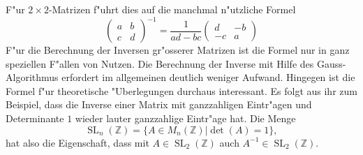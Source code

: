 F"ur $2\times2$-Matrizen f"uhrt dies auf die manchmal n"utzliche
Formel
\[
\begin{pmatrix}
a&b\\c&d
\end{pmatrix}^{-1}
=
\frac1{ad-bc}\begin{pmatrix}
d&-b\\-c&a
\end{pmatrix}
\]
F"ur die Berechnung der Inversen gr"osserer Matrizen ist die Formel
nur in ganz speziellen F"allen von Nutzen.
Die Berechnung der Inverse
mit Hilfe des Gauss-Algorithmus erfordert im allgemeinen deutlich weniger
Aufwand.
Hingegen ist die Formel f"ur theoretische "Uberlegungen durchaus
interessant.
Es folgt aus ihr zum Beispiel, dass die Inverse einer
Matrix mit ganzzahligen Eintr"agen und Determinante $1$ wieder
lauter ganzzahlige Eintr"age hat.
Die Menge
\[
\operatorname{SL}_n(\mathbb Z)=\{A\in M_{n}(\mathbb Z)|\det(A)=1\},
\]
hat also die Eigenschaft, dass mit $A\in\operatorname{SL}_2(\mathbb Z)$ 
auch $A^{-1}\in\operatorname{SL}_2(\mathbb Z)$.

